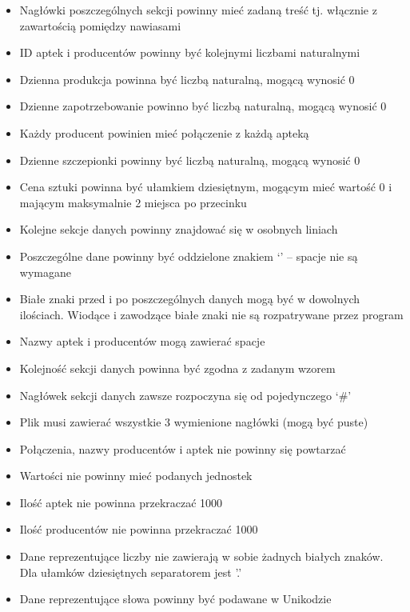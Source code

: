 \documentclass[]{article}
\begin{document}
    \begin{itemize}
        \item
        Nagłówki poszczególnych sekcji powinny mieć zadaną treść tj. włącznie
        z zawartością pomiędzy nawiasami
        \item
        ID aptek i producentów powinny być kolejnymi liczbami naturalnymi
        \item
        Dzienna produkcja powinna być liczbą naturalną, mogącą wynosić 0
        \item
        Dzienne zapotrzebowanie powinno być liczbą naturalną, mogącą wynosić 0
        \item
        Każdy producent powinien mieć połączenie z każdą apteką
        \item
        Dzienne szczepionki powinny być liczbą naturalną, mogącą wynosić 0
        \item
        Cena sztuki powinna być ułamkiem dziesiętnym, mogącym mieć wartość 0 i
        mającym maksymalnie 2 miejsca po przecinku
        \item
        Kolejne sekcje danych powinny znajdować się w osobnych liniach
        \item
        Poszczególne dane powinny być oddzielone znakiem `\textbar{}' --
        spacje nie są wymagane
        \item
        Białe znaki przed i po poszczególnych danych mogą być w dowolnych ilościach.
        Wiodące i zawodzące białe znaki nie są rozpatrywane przez program
        \item
        Nazwy aptek i producentów mogą zawierać spacje
        \item
        Kolejność sekcji danych powinna być zgodna z zadanym wzorem
        \item
        Nagłówek sekcji danych zawsze rozpoczyna się od pojedynczego `\#'
        \item
        Plik musi zawierać wszystkie 3 wymienione nagłówki (mogą być puste)
        \item
        Połączenia, nazwy producentów i aptek nie powinny się powtarzać
        \item
        Wartości nie powinny mieć podanych jednostek
        \item
        Ilość aptek nie powinna przekraczać 1000
        \item
        Ilość producentów nie powinna przekraczać 1000
        \item
        Dane reprezentujące liczby nie zawierają w sobie żadnych białych znaków. Dla ułamków dziesiętnych separatorem jest '.'
        \item
        Dane reprezentujące słowa powinny być podawane w Unikodzie
    \end{itemize}
\end{document}
